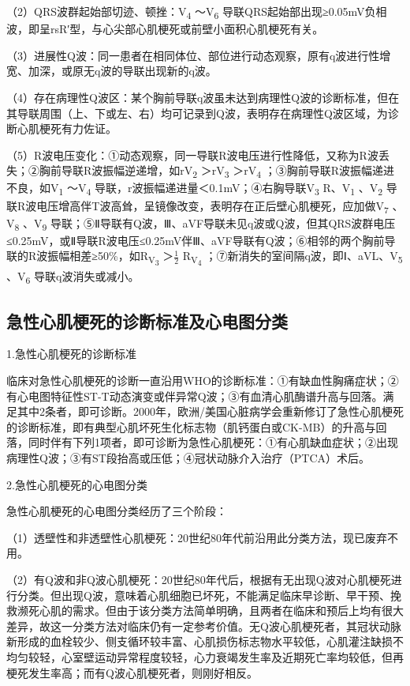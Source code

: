 （2）QRS波群起始部切迹、顿挫：V\textsubscript{4} ～V\textsubscript{6}
导联QRS起始部出现≥0.05mV负相波，即呈rsR′型，与心尖部心肌梗死或前壁小面积心肌梗死有关。

（3）进展性Q波：同一患者在相同体位、部位进行动态观察，原有q波进行性增宽、加深，或原无q波的导联出现新的q波。

（4）存在病理性Q波区：某个胸前导联q波虽未达到病理性Q波的诊断标准，但在其导联周围（上、下或左、右）均可记录到Q波，表明存在病理性Q波区域，为诊断心肌梗死有力佐证。

（5）R波电压变化：①动态观察，同一导联R波电压进行性降低，又称为R波丢失；②胸前导联R波振幅逆递增，如rV\textsubscript{2}
＞rV\textsubscript{3} ＞rV\textsubscript{4}
；③胸前导联R波振幅递进不良，如V\textsubscript{1} ～V\textsubscript{4}
导联，r波振幅递进量＜0.1mV；④右胸导联V\textsubscript{3}
R、V\textsubscript{1} 、V\textsubscript{2}
导联R波电压增高伴T波高耸，呈镜像改变，表明存在正后壁心肌梗死，应加做V\textsubscript{7}
、V\textsubscript{8} 、V\textsubscript{9}
导联；⑤Ⅱ导联有Q波，Ⅲ、aVF导联未见q波或Q波，但其QRS波群电压≤0.25mV，或Ⅱ导联R波电压≤0.25mV伴Ⅲ、aVF导联有Q波；⑥相邻的两个胸前导联的R波振幅相差≥50\%，如R\textsubscript{V\textsubscript{3}}
＞$\frac{1}{2}$
R\textsubscript{V\textsubscript{4}}
；⑦新消失的室间隔q波，即Ⅰ、aVL、V\textsubscript{5} 、V\textsubscript{6}
导联q波消失或减小。

\protect\hypertarget{text00052.htmlux5cux23subid625}{}{}

\subsection{急性心肌梗死的诊断标准及心电图分类}

1.急性心肌梗死的诊断标准

临床对急性心肌梗死的诊断一直沿用WHO的诊断标准：①有缺血性胸痛症状；②有心电图特征性ST-T动态演变或伴异常Q波；③有血清心肌酶谱升高与回落。满足其中2条者，即可诊断。2000年，欧洲/美国心脏病学会重新修订了急性心肌梗死的诊断标准，即有典型心肌坏死生化标志物（肌钙蛋白或CK-MB）的升高与回落，同时伴有下列1项者，即可诊断为急性心肌梗死：①有心肌缺血症状；②出现病理性Q波；③有ST段抬高或压低；④冠状动脉介入治疗（PTCA）术后。

2.急性心肌梗死的心电图分类

急性心肌梗死的心电图分类经历了三个阶段：

（1）透壁性和非透壁性心肌梗死：20世纪80年代前沿用此分类方法，现已废弃不用。

（2）有Q波和非Q波心肌梗死：20世纪80年代后，根据有无出现Q波对心肌梗死进行分类。但出现Q波，意味着心肌细胞已坏死，不能满足临床早诊断、早干预、挽救濒死心肌的需求。但由于该分类方法简单明确，且两者在临床和预后上均有很大差异，故这一分类方法对临床仍有一定参考价值。无Q波心肌梗死者，其冠状动脉新形成的血栓较少、侧支循环较丰富、心肌损伤标志物水平较低，心肌灌注缺损不均匀较轻，心室壁运动异常程度较轻，心力衰竭发生率及近期死亡率均较低，但再梗死发生率高；而有Q波心肌梗死者，则刚好相反。

